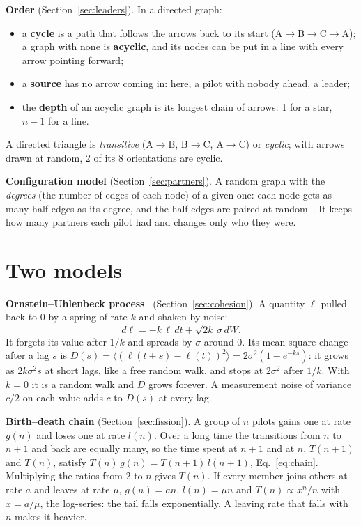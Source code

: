 \textbf{Order} (Section~\ref{sec:leaders}). In a directed graph:
\begin{itemize}
  \item a \textbf{cycle} is a path that follows the arrows back to its start (A$\to$B$\to$C$\to$A);
        a graph with none is \textbf{acyclic}, and its nodes can be put in a line with every arrow
        pointing forward;
  \item a \textbf{source} has no arrow coming in: here, a pilot with nobody ahead, a leader;
  \item the \textbf{depth} of an acyclic graph is its longest chain of arrows: 1 for a star, $n-1$ for a line.
\end{itemize}
A directed triangle is \emph{transitive} (A$\to$B, B$\to$C, A$\to$C) or \emph{cyclic}; with arrows drawn
at random, 2 of its 8 orientations are cyclic.

\textbf{Configuration model} (Section~\ref{sec:partners}). A random graph with the \emph{degrees} (the number
of edges of each node) of a given one: each node gets as many half-edges as its degree, and the
half-edges are paired at random~\cite{newman2010}. It keeps how many partners each pilot had and
changes only who they were.

\section{Two models}\label{app:models}

\textbf{Ornstein--Uhlenbeck process}~\cite{uhlenbeck1930} (Section~\ref{sec:cohesion}). A quantity $\ell$
pulled back to 0 by a spring of rate $k$ and shaken by noise:
\begin{equation}
  d\ell=-k\,\ell\,dt+\sqrt{2k}\,\sigma\,dW .
\end{equation}
It forgets its value after $1/k$ and spreads by $\sigma$ around 0. Its mean square change after a lag
$s$ is $D(s)=\langle(\ell(t+s)-\ell(t))^2\rangle=2\sigma^2(1-e^{-ks})$: it grows as $2k\sigma^2 s$ at short
lags, like a free random walk, and stops at $2\sigma^2$ after $1/k$. With $k=0$ it is a random walk and
$D$ grows forever. A measurement noise of variance $c/2$ on each value adds $c$ to $D(s)$ at every lag.

\textbf{Birth--death chain} (Section~\ref{sec:fission}). A group of $n$ pilots gains one at rate $g(n)$ and
loses one at rate $l(n)$. Over a long time the transitions from $n$ to $n+1$ and back are equally
many, so the time spent at $n+1$ and at $n$, $T(n+1)$ and $T(n)$, satisfy $T(n)\,g(n)=T(n+1)\,l(n+1)$,
Eq.~\eqref{eq:chain}. Multiplying the ratios from 2 to $n$ gives $T(n)$. If every member joins others at
rate $a$ and leaves at rate $\mu$, $g(n)=an$, $l(n)=\mu n$ and $T(n)\propto x^n/n$ with $x=a/\mu$, the
log-series: the tail falls exponentially. A leaving rate that falls with $n$ makes it heavier.

